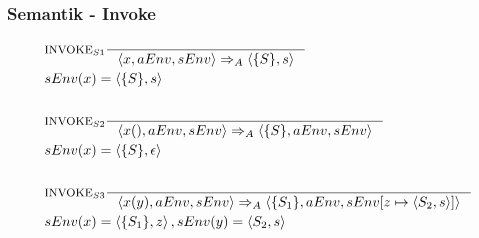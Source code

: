 \begin{frame}
  \frametitle{Semantik - Invoke}
  \begin{align*}
	&\inference[$\text{INVOKE}_{S1}$]{}
                  {\Braket{x,aEnv,sEnv} \Rightarrow_A \Braket{\{S\},s}}
									\\
                  &{sEnv(x) = \Braket{\{S\},s}}
	\\\\
	&\inference[$\text{INVOKE}_{S2}$]{}
                  {\Braket{x(),aEnv,sEnv} \Rightarrow_A \Braket{\{S\},aEnv,sEnv}}
									\\
                  &{sEnv(x) = \Braket{\{S\},\epsilon}}
	\\\\
	&\inference[$\text{INVOKE}_{S3}$]{}
                  {\Braket{x(y),aEnv,sEnv} \Rightarrow_A \Braket{\{S_1\},aEnv,sEnv[z \mapsto \Braket{S_2,s}]}}
                  \\
					        &{sEnv(x) = \Braket{\{S_1\},z}, sEnv(y) = \Braket{S_2,s}}
	\end{align*}
\end{frame}